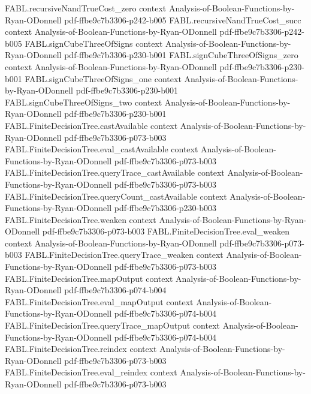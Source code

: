 \begin{theorem}
\proofstep
  {FABL.recursiveNandTrueCost_zero}
  {context}
  {Analysis-of-Boolean-Functions-by-Ryan-ODonnell}
  {pdf-ffbe9c7b3306-p242-b005}
\proofstep
  {FABL.recursiveNandTrueCost_succ}
  {context}
  {Analysis-of-Boolean-Functions-by-Ryan-ODonnell}
  {pdf-ffbe9c7b3306-p242-b005}
\proofstep
  {FABL.signCubeThreeOfSigns}
  {context}
  {Analysis-of-Boolean-Functions-by-Ryan-ODonnell}
  {pdf-ffbe9c7b3306-p230-b001}
\proofstep
  {FABL.signCubeThreeOfSigns_zero}
  {context}
  {Analysis-of-Boolean-Functions-by-Ryan-ODonnell}
  {pdf-ffbe9c7b3306-p230-b001}
\proofstep
  {FABL.signCubeThreeOfSigns_one}
  {context}
  {Analysis-of-Boolean-Functions-by-Ryan-ODonnell}
  {pdf-ffbe9c7b3306-p230-b001}
\proofstep
  {FABL.signCubeThreeOfSigns_two}
  {context}
  {Analysis-of-Boolean-Functions-by-Ryan-ODonnell}
  {pdf-ffbe9c7b3306-p230-b001}
\proofstep
  {FABL.FiniteDecisionTree.castAvailable}
  {context}
  {Analysis-of-Boolean-Functions-by-Ryan-ODonnell}
  {pdf-ffbe9c7b3306-p073-b003}
\proofstep
  {FABL.FiniteDecisionTree.eval_castAvailable}
  {context}
  {Analysis-of-Boolean-Functions-by-Ryan-ODonnell}
  {pdf-ffbe9c7b3306-p073-b003}
\proofstep
  {FABL.FiniteDecisionTree.queryTrace_castAvailable}
  {context}
  {Analysis-of-Boolean-Functions-by-Ryan-ODonnell}
  {pdf-ffbe9c7b3306-p073-b003}
\proofstep
  {FABL.FiniteDecisionTree.queryCount_castAvailable}
  {context}
  {Analysis-of-Boolean-Functions-by-Ryan-ODonnell}
  {pdf-ffbe9c7b3306-p230-b003}
\proofstep
  {FABL.FiniteDecisionTree.weaken}
  {context}
  {Analysis-of-Boolean-Functions-by-Ryan-ODonnell}
  {pdf-ffbe9c7b3306-p073-b003}
\proofstep
  {FABL.FiniteDecisionTree.eval_weaken}
  {context}
  {Analysis-of-Boolean-Functions-by-Ryan-ODonnell}
  {pdf-ffbe9c7b3306-p073-b003}
\proofstep
  {FABL.FiniteDecisionTree.queryTrace_weaken}
  {context}
  {Analysis-of-Boolean-Functions-by-Ryan-ODonnell}
  {pdf-ffbe9c7b3306-p073-b003}
\proofstep
  {FABL.FiniteDecisionTree.mapOutput}
  {context}
  {Analysis-of-Boolean-Functions-by-Ryan-ODonnell}
  {pdf-ffbe9c7b3306-p074-b004}
\proofstep
  {FABL.FiniteDecisionTree.eval_mapOutput}
  {context}
  {Analysis-of-Boolean-Functions-by-Ryan-ODonnell}
  {pdf-ffbe9c7b3306-p074-b004}
\proofstep
  {FABL.FiniteDecisionTree.queryTrace_mapOutput}
  {context}
  {Analysis-of-Boolean-Functions-by-Ryan-ODonnell}
  {pdf-ffbe9c7b3306-p074-b004}
\proofstep
  {FABL.FiniteDecisionTree.reindex}
  {context}
  {Analysis-of-Boolean-Functions-by-Ryan-ODonnell}
  {pdf-ffbe9c7b3306-p073-b003}
\proofstep
  {FABL.FiniteDecisionTree.eval_reindex}
  {context}
  {Analysis-of-Boolean-Functions-by-Ryan-ODonnell}
  {pdf-ffbe9c7b3306-p073-b003}

\end{theorem}
